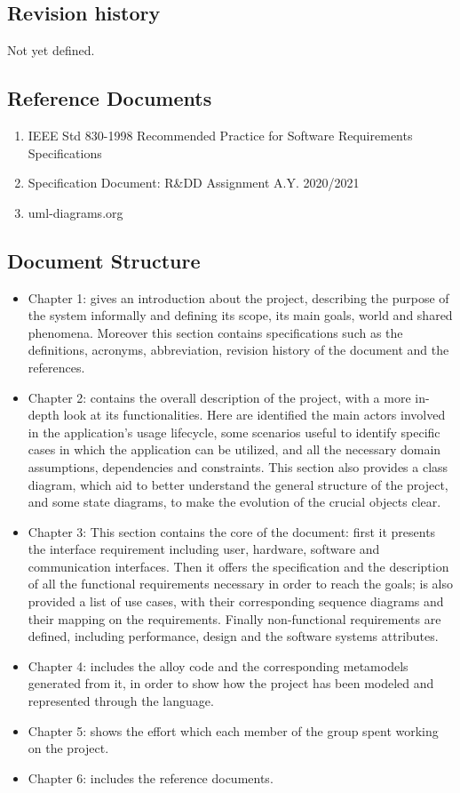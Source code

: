 \subsection{Revision history}
Not yet defined.
\subsection{Reference Documents}
\begin{enumerate}
	\item IEEE Std 830-1998 Recommended Practice for Software Requirements Specifications
	\item Specification Document: R\&DD Assignment A.Y. 2020/2021
	\item uml-diagrams.org
\end{enumerate}
\subsection{Document Structure}
\begin{itemize}
	\item Chapter 1: gives an introduction about the project, describing the purpose of the    system informally and defining its scope, its main goals, world and shared phenomena. Moreover this section contains specifications such as the definitions, acronyms, abbreviation,	revision history of the document and the references.
	\item Chapter 2: contains the overall description of the project, with a more in-depth look at its functionalities. Here are identified the main actors involved in the application’s usage lifecycle, some scenarios useful to identify specific cases in which the application can be utilized, and all the necessary domain assumptions, dependencies and constraints. This section also provides a class diagram, which aid to better understand the general structure of the project, and some state diagrams, to make the evolution of the crucial objects clear.
	\item Chapter 3: This section contains the core of the document: first it presents the interface requirement including user, hardware, software and communication interfaces.
	Then it offers the specification and the description of all the functional requirements necessary in order to reach the goals; is also provided a list of use cases, with their corresponding sequence diagrams and their mapping on the requirements.
	Finally non-functional requirements are defined, including performance, design and the software systems attributes.
	\item Chapter 4: includes the alloy code and the corresponding metamodels generated from it, in order to show how the project has been modeled and represented through the language.   
	\item Chapter 5: shows the effort which each member of the group spent working on the project.
	\item Chapter 6: includes the reference documents.
\end{itemize}

